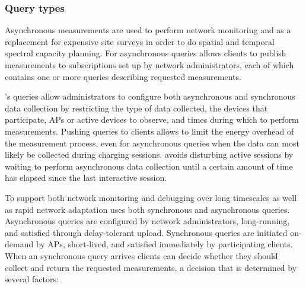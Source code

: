 \subsubsection{Query types}

Asynchronous measurements are used to perform network monitoring and as a
replacement for expensive site surveys in order to do spatial and temporal
spectral capacity planning. For asynchronous queries \PS{} allows clients to
publish measurements to subscriptions set up by network administrators, each
of which contains one or more queries describing requested measurements.

\PS{}'s queries allow administrators to configure both asynchronous and
synchronous data collection by restricting the type of data collected, the
devices that participate, APs or active devices to observe, and times during
which to perform measurements. Pushing queries to clients allows \PS{} to
limit the energy overhead of the measurement process, even for asynchronous
queries when the data can most likely be collected during charging sessions.
\PS{} avoids disturbing active sessions by waiting to perform asynchronous
data collection until a certain amount of time has elapsed since the last
interactive session.

To support both network monitoring and debugging over long timescales as well
as rapid network adaptation \PS{} uses both synchronous and asynchronous
queries. Asynchronous queries are configured by network administrators,
long-running, and satisfied through delay-tolerant upload. Synchronous
queries are initiated on-demand by APs, short-lived, and satisfied
immediately by participating clients. When an synchronous query arrives
\PS{} clients can decide whether they should collect and return the requested
measurements, a decision that is determined by several factors:

